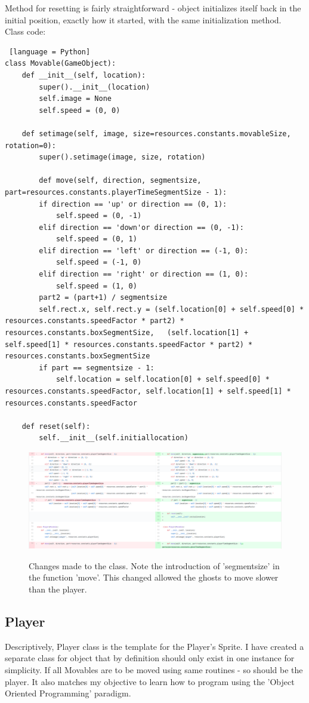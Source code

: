 \documentclass[11pt,a4paper,notitlepage]{report}
\newcommand{\dsubsection}[1]{\FloatBarrier \subsection{#1}}
\newenvironment{img}{
	\begin{center}
		\begin{figure}[H]
			\begin{center}
			
}{
	\end{center}
		\end{figure}
			\end{center}
}
\begin{document}
				Method for resetting is fairly straightforward - object initializes itself back in the initial position, exactly how it started, with the same initialization method.\\
				Class code:
				\begin{lstlisting} [language = Python]
class Movable(GameObject):
	def __init__(self, location):
		super().__init__(location)
		self.image = None
		self.speed = (0, 0)
		
	def setimage(self, image, size=resources.constants.movableSize, rotation=0):
		super().setimage(image, size, rotation)
	
		def move(self, direction, segmentsize, part=resources.constants.playerTimeSegmentSize - 1):
		if direction == 'up' or direction == (0, 1):
			self.speed = (0, -1)
		elif direction == 'down'or direction == (0, -1):
			self.speed = (0, 1)
		elif direction == 'left' or direction == (-1, 0):
			self.speed = (-1, 0)
		elif direction == 'right' or direction == (1, 0):
			self.speed = (1, 0)
		part2 = (part+1) / segmentsize
		self.rect.x, self.rect.y = (self.location[0] + self.speed[0] * resources.constants.speedFactor * part2) * resources.constants.boxSegmentSize,	(self.location[1] + self.speed[1] * resources.constants.speedFactor * part2) * resources.constants.boxSegmentSize
		if part == segmentsize - 1:
			self.location = self.location[0] + self.speed[0] * resources.constants.speedFactor, self.location[1] + self.speed[1] * resources.constants.speedFactor
	
	def reset(self):
		self.__init__(self.initiallocation)
				\end{lstlisting}
				\begin{img}
					\includegraphics[width = 350pt]{images/move-changes.png}\\
					\caption{Changes made to the class. Note the introduction of 'segmentsize' in the function 'move'. This changed allowed the ghosts to move slower than the player.}
				\end{img}
			\dsubsection{Player}
				Descriptively, Player class is the template for the Player's Sprite. I have created a separate class for object that by definition should only exist in one instance for simplicity. If all Movables are to be moved using same routines - so should be the player. It also matches my objective to learn how to program using the 'Object Oriented Programming' paradigm. 
\end{document}
